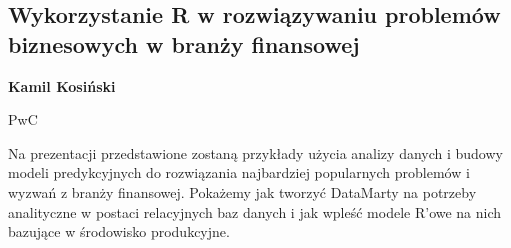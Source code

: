 \documentclass[\main/boa.tex]{subfiles}
\begin{document}
\subsection{Wykorzystanie R w rozwiązywaniu problemów biznesowych w branży finansowej}

\begin{minipage}{0.915\textwidth}
	\centering
  {\bf {}  Kamil Kosiński}
\end{minipage}

\vskip 0.3cm

\begin{affiliations}
\begin{minipage}{0.915\textwidth}
\centering
PwC \\[-2pt]
\end{minipage}
\end{affiliations}

\vskip 0.8cm

  Na prezentacji przedstawione zostaną przykłady użycia analizy danych i budowy modeli predykcyjnych do rozwiązania najbardziej popularnych problemów i wyzwań z branży finansowej. Pokażemy jak tworzyć DataMarty na potrzeby analityczne w postaci relacyjnych baz danych i jak wpleść modele R'owe na nich bazujące w środowisko produkcyjne. 
\end{document}

